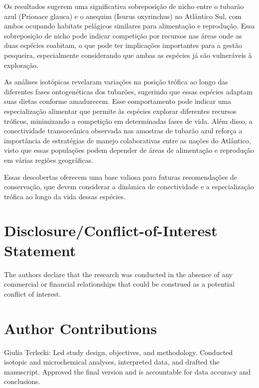 \documentclass[utf8]{FrontiersinHarvard}
\begin{document}
Os resultados sugerem uma significativa sobreposição de nicho entre o
tubarão azul (Prionace glauca) e o anequim (Isurus oxyrinchus) no
Atlântico Sul, com ambos ocupando habitats pelágicos similares para
alimentação e reprodução. Essa sobreposição de nicho pode indicar
competição por recursos nas áreas onde as duas espécies coabitam, o que
pode ter implicações importantes para a gestão pesqueira, especialmente
considerando que ambas as espécies já são vulneráveis à exploração.

As análises isotópicas revelaram variações na posição trófica ao longo
das diferentes fases ontogenéticas dos tubarões, sugerindo que essas
espécies adaptam suas dietas conforme amadurecem. Esse comportamento
pode indicar uma especialização alimentar que permite às espécies
explorar diferentes recursos tróficos, minimizando a competição em
determinadas fases de vida. Além disso, a conectividade transoceânica
observada nas amostras de tubarão azul reforça a importância de
estratégias de manejo colaborativas entre as nações do Atlântico, visto
que essas populações podem depender de áreas de alimentação e reprodução
em várias regiões geográficas.

Essas descobertas oferecem uma base valiosa para futuras recomendações
de conservação, que devem considerar a dinâmica de conectividade e a
especialização trófica ao longo da vida dessas espécies.

\section*{Disclosure/Conflict-of-Interest
Statement}\label{disclosureconflict-of-interest-statement}

The authors declare that the research was conducted in the absence of
any commercial or financial relationships that could be construed as a
potential conflict of interest.

\section*{Author Contributions}\label{author-contributions}

Giulia Terlecki: Led study design, objectives, and methodology.
Conducted isotopic and microchemical analyses, interpreted data, and
drafted the manuscript. Approved the final version and is accountable
for data accuracy and conclusions.
\end{document}
